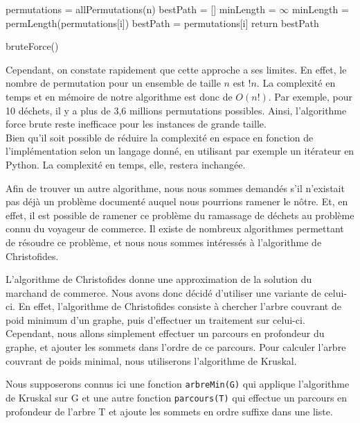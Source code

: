 \documentclass{article}
\begin{document}
  \begin{algorithm}[H]
    \SetAlgoLined
    permutations = allPermutations(n)\;
    bestPath = []\;
    minLength = $\infty$ \;
    {
        {
            minLength = permLength(permutations[i])\;
            bestPath = permutations[i]\;
        }
    }
    return bestPath\;
    \caption{bruteForce()}
  \end{algorithm}

  Cependant, on constate rapidement que cette approche a ses limites. En effet, le nombre de permutation pour un ensemble de taille $n$ est $!n$. La complexité en temps et en mémoire de notre algorithme est donc de $O(n!)$.
Par exemple, pour 10 d\'echets, il y a plus de 3,6 millions permutations possibles. Ainsi, l'algorithme force brute reste inefficace pour les instances de grande taille. \\

Bien qu'il soit possible de réduire la complexité en espace en fonction de l'implémentation selon un langage donné, en utilisant par exemple un itérateur en Python. La complexité en temps, elle, restera inchangée.\newline

Afin de trouver un autre algorithme, nous nous sommes demandés s'il n'existait pas déjà un problème documenté auquel nous pourrions ramener le nôtre.
Et, en effet, il est possible de ramener ce problème du ramassage de déchets au problème connu du voyageur de commerce.
Il existe de nombreux algorithmes permettant de résoudre ce problème, et nous nous sommes intéressés à l'algorithme de Christofides.

L'algorithme de Christofides donne une approximation de la solution du marchand de commerce.
Nous avons donc décidé d'utiliser une variante de celui-ci. En effet, l'algorithme de Christofides consiste à chercher l'arbre couvrant de poid minimum d'un graphe, puis d'effectuer un traitement sur celui-ci.
Cependant, nous allons simplement effectuer un parcours en profondeur du graphe, et ajouter les sommets dans l'ordre de ce parcours.
Pour calculer l'arbre couvrant de poids minimal, nous utiliserons l'algorithme de Kruskal.\newline

Nous supposerons connus ici une fonction \texttt{arbreMin(G)} qui applique l'algorithme de Kruskal sur G et une autre fonction \texttt{parcours(T)} qui effectue un parcours en profondeur de l'arbre T et ajoute les sommets en ordre suffixe dans une liste.\newline
\end{document}
